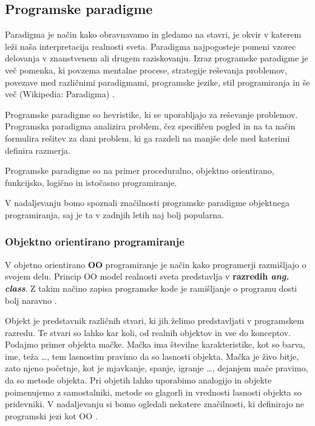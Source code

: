\subsection{Programske paradigme}
\label{sec:programske_paradigme}

Paradigma je način kako obravnavamo in gledamo na stavri, je okvir v
katerem leži naša interpretacija realnosti sveta. Paradigma
najpogosteje pomeni vzorec delovanja v znanstvenem ali drugem
raziskovanju.  Izraz programske paradigme je več pomenka, ki povzema
mentalne procese, strategije reševanja problemov, povezave med
različnimi paradigmami, programske jezike, stil programiranja in še
več (Wikipedia: Paradigma) \cite{guideTCS}.

Programske paradigme so hevristike, ki se uporabljajo za reševanje
problemov. Programska paradigma analizira problem, čez specifičen
pogled in na ta način formulira rešitev za dani problem, ki ga razdeli
na manjše dele med katerimi definira razmerja.

Programske paradigme so na primer proceduralno, objektno orientirano,
funkcijsko, logično in istočasno programiranje.

V nadaljevanju bomo spoznali značilnosti programske paradigme
objektnega programiranja, saj je ta v zadnjih letih naj bolj
popularna.

\subsubsection{Objektno orientirano programiranje}
\label{sec:objektno_orijentirano_programiranje}


V objetno orientirano \textbf{OO} programiranje je način kako
programerji razmišljajo o svojem delu. Princip OO model realnosti
sveta predstavlja v \textbf{razredih \emph{ang. class}}. Z takim
načino zapisa programske kode je ramišljanje o programu dosti bolj
naravno \cite{shaums}.

Objekt je predstavnik različnih stvari, ki jih želimo predstavljati v
programskem razredu. Te stvari so lahko kar koli, od realnih objektov
in vse do konceptov. Podajmo primer objekta mačke. Mačka ima številne
karakteristike, kot so barva, ime, teža \dots, tem lasnostim pravimo
da so lasnosti objekta. Mačka je živo bitje, zato njeno početnje, kot
je mjavkanje, spanje, igranje \dots, dejanjem mače pravimo, da so
metode objekta. Pri objetih lahko uporabimo analogijo in objekte
poimenujemo z samostalniki, metode so glagorli in vrednosti lasnosti
objekta so pridevniki. V nadaljevanju si bomo ogledali nekatere
značilnosti, ki definirajo ne programski jezi kot OO \cite{OO-JS}.

